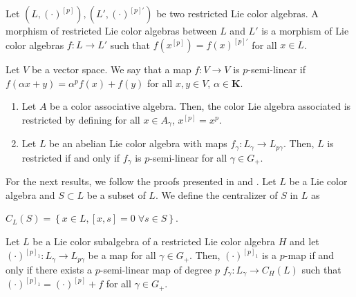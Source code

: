 \documentclass[11pt, twoside]{article}
\begin{document}
\begin{defi}
    Let $(L,(\cdot)^{[p]}), (L',(\cdot)^{[p]'})$ be two restricted Lie color algebras. A morphism of restricted Lie color algebras between $L$ and $L'$ is a morphism of Lie color algebras $f:L\to L' $ such that $f(x^{[p]})=f(x)^{[p]'} $ for all $x\in L$.
\end{defi}

\begin{defi}
    Let $V$ be a vector space. We say that a map $f:V\to V $ is $p$-semi-linear if $f(\alpha x+ y)= \alpha^p f(x)+ f(y) $ for all $x,y\in V$, $\alpha\in \mathbf{K}$.
\end{defi}

\begin{ex}
    \begin{enumerate}
        \item Let $A$ be a color associative algebra. Then, the color Lie algebra associated is restricted by defining for all $x\in A_\gamma $, $x^{[p]}=x^p $.
        \item Let $L$ be an abelian Lie color algebra with maps $f_\gamma:L_\gamma\to L_{p\gamma} $. Then, $L$ is restricted if and only if $f_\gamma $ is $p$-semi-linear for all  $\gamma\in G_+ $.
    \end{enumerate}
\end{ex}

For the next results, we follow the proofs presented in \cite{SF88} and \cite{E23}.
Let $L$ be a Lie color algebra and $S\subset L$ be a subset of $L$. We define the centralizer of $S$ in $L$ as \begin{center}
    $C_L(S)=\left\{ x\in L, [x,s]=0 \; \forall s\in S \right\} $.
\end{center}


\begin{prop}\label{p3.4}
    Let $L$ be a  Lie color subalgebra of a restricted Lie color algebra $H$ and let $(\cdot)^{[p]_1}:L_\gamma\to L_{p\gamma} $ be a map for all $\gamma \in G_+ $. Then, $(\cdot)^{[p]_1} $ is a $p$-map if and only if there exists a $p$-semi-linear map of degree $p$ $f_\gamma:L_\gamma\to C_H(L)$ such that $(\cdot)^{[p]_1}=(\cdot)^{[p]}+f $ for all $\gamma\in G_+$.
\end{prop}
\end{document}
